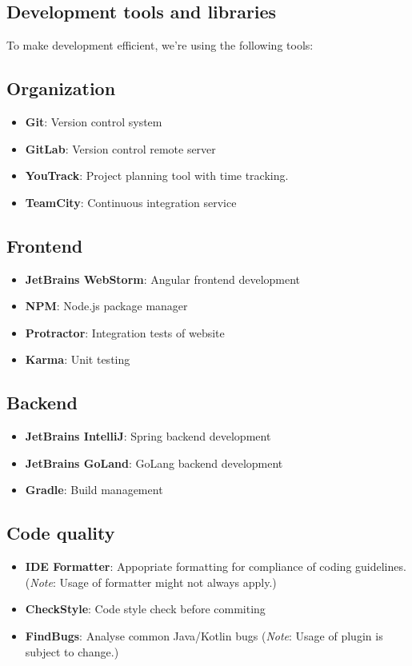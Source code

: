 \documentclass[a4paper,12pt,chapterprefix=false,bibliography=totoc,listof=totoc,]{scrreprt}
\begin{document}
\subsection{Development tools and libraries}
To make development efficient, we're using the following tools:

\subsection*{Organization}
\begin{itemize}
	\item \textbf{Git}: Version control system
	\item \textbf{GitLab}: Version control remote server
    \item \textbf{YouTrack}: Project planning tool with time tracking.
	\item \textbf{TeamCity}: Continuous integration service	
\end{itemize}

\subsection*{Frontend}
\begin{itemize}
    \item \textbf{JetBrains WebStorm}: Angular frontend development
	\item \textbf{NPM}: Node.js package manager
	\item \textbf{Protractor}: Integration tests of website
	\item \textbf{Karma}: Unit testing
\end{itemize}

\subsection*{Backend}
\begin{itemize}
	\item \textbf{JetBrains IntelliJ}: Spring backend development
	\item \textbf{JetBrains GoLand}: GoLang backend development
	\item \textbf{Gradle}: Build management
\end{itemize}

\subsection*{Code quality}
\begin{itemize}
	\item \textbf{IDE Formatter}: Appopriate formatting for compliance of coding guidelines. (\textit{Note}: Usage of formatter might not always apply.)
	\item \textbf{CheckStyle}: Code style check before commiting
	\item \textbf{FindBugs}: Analyse common Java/Kotlin bugs 
	(\textit{Note}: Usage of plugin is subject to change.)
\end{itemize}
\end{document}
